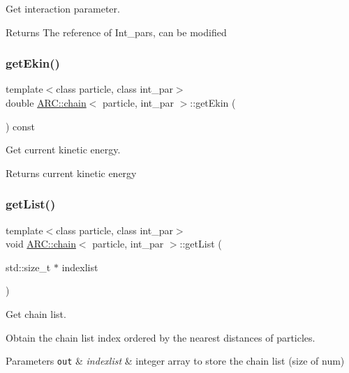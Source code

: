Get interaction parameter. 

\begin{DoxyReturn}{Returns}
The reference of Int\+\_\+pars, can be modified 
\end{DoxyReturn}
\hypertarget{classARC_1_1chain_aec4fe3207a5fe2d0a254bdd4bb54ae7f}{}\label{classARC_1_1chain_aec4fe3207a5fe2d0a254bdd4bb54ae7f} 
\subsubsection{\texorpdfstring{get\+Ekin()}{getEkin()}}
{\footnotesize\ttfamily template$<$class particle, class int\+\_\+par$>$ \\
double \hyperlink{classARC_1_1chain}{A\+R\+C\+::chain}$<$ particle, int\+\_\+par $>$\+::get\+Ekin (\begin{DoxyParamCaption}{ }\end{DoxyParamCaption}) const\hspace{0.3cm}{\ttfamily [inline]}}



Get current kinetic energy. 

\begin{DoxyReturn}{Returns}
current kinetic energy 
\end{DoxyReturn}
\hypertarget{classARC_1_1chain_a5e5a7da2a07800be47623794fe6fe44d}{}\label{classARC_1_1chain_a5e5a7da2a07800be47623794fe6fe44d} 
\subsubsection{\texorpdfstring{get\+List()}{getList()}}
{\footnotesize\ttfamily template$<$class particle, class int\+\_\+par$>$ \\
void \hyperlink{classARC_1_1chain}{A\+R\+C\+::chain}$<$ particle, int\+\_\+par $>$\+::get\+List (\begin{DoxyParamCaption}\item[{std\+::size\+\_\+t $\ast$}]{indexlist }\end{DoxyParamCaption})\hspace{0.3cm}{\ttfamily [inline]}}



Get chain list. 

Obtain the chain list index ordered by the nearest distances of particles. 
\begin{DoxyParams}[1]{Parameters}
\mbox{\tt out}  & {\em indexlist} & integer array to store the chain list (size of num) \\
\hline
\end{DoxyParams}
\hypertarget{classARC_1_1chain_a582ad9ae8003400e06bba908d70d60d9}{}\label{classARC_1_1chain_a582ad9ae8003400e06bba908d70d60d9} 
